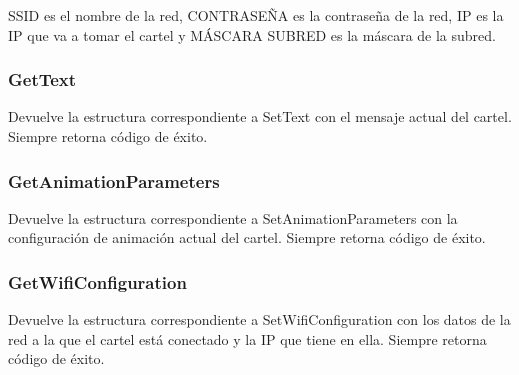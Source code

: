 SSID es el nombre de la red, CONTRASEÑA es la contraseña de la red, IP es la IP que va a tomar el cartel y MÁSCARA SUBRED es la máscara de la subred.

\subsubsection{GetText}
Devuelve la estructura correspondiente a SetText con el mensaje actual del cartel.
Siempre retorna código de éxito.

\subsubsection{GetAnimationParameters}
Devuelve la estructura correspondiente a SetAnimationParameters con la configuración de animación actual del cartel.
Siempre retorna código de éxito.

\subsubsection{GetWifiConfiguration}
Devuelve la estructura correspondiente a SetWifiConfiguration con los datos de la red a la que el cartel está conectado y la IP que tiene en ella.
Siempre retorna código de éxito.
